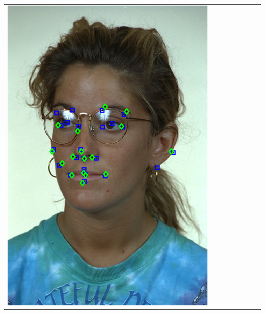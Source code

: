 \documentclass[landscape,final,a0paper,fontscale=0.27065]{baposter}
\begin{document}
\begin{poster}
{{\begin{tabular}{@{}rccccccc@{}}
 \parbox[c]{0.11\linewidth}{\includegraphics[width=\linewidth]{images/l_ql_success_2.pdf}} &

\end{tabular}}}
\end{poster}
\end{document}
